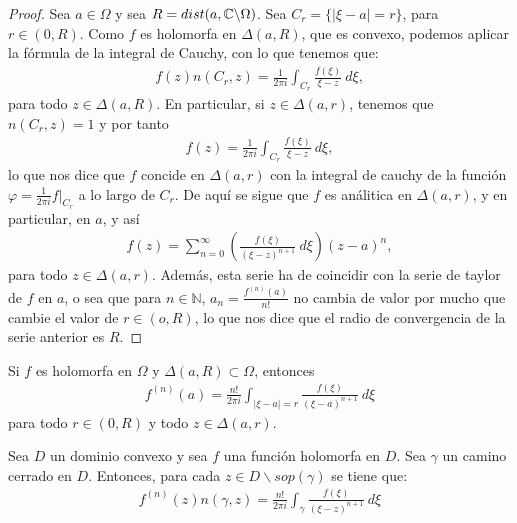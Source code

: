 \begin{proof}
    Sea $a \in \Omega$ y sea $R = dist(a, \mathbb{C} \backslash \Omega)$. Sea $C_r = \{ |\xi - a| = r \}$, para $r \in (0,R)$. Como $f$ es holomorfa en $\Delta(a,R)$, que es convexo, podemos aplicar la fórmula de la integral de Cauchy, con lo que tenemos que:
    \begin{align*}
        f(z)n(C_r,z) = \frac{1}{2\pi i}\int_{C_r}{\frac{f(\xi)}{\xi - z} \ d\xi},
    \end{align*}
    para todo $z \in \Delta(a,R)$. En particular, si $z \in \Delta(a,r)$, tenemos que $n(C_r,z) = 1$ y por tanto
    \begin{align*}
        f(z) = \frac{1}{2\pi i}\int_{C_r}{\frac{f(\xi)}{\xi - z} \ d\xi},
    \end{align*}
    lo que nos dice que $f$ concide en $\Delta(a,r)$ con la integral de cauchy de la función $\varphi = \frac{1}{2\pi i}f|_{C_r}$ a lo largo de $C_r$. De aquí se sigue que $f$ es análitica en $\Delta(a,r)$, y en particular, en $a$, y así
    \begin{align*}
        f(z) = \sum_{n=0}^{\infty}\left( \frac{f(\xi)}{(\xi - z)^{n+1}} \ d\xi \right)(z-a)^n,
    \end{align*}
    para todo $z \in \Delta(a,r)$. Además, esta serie ha de coincidir con la serie de taylor de $f$ en $a$, o sea que para $n \in \mathbb{N}$, $a_n = \frac{f^{(n)}(a)}{n!}$ no cambia de valor por mucho que cambie el valor de $r \in (o,R)$, lo que nos dice que el radio de convergencia de la serie anterior es $R$.
\end{proof}

\begin{obs}
    Si $f$ es holomorfa en $\Omega$ y $\Delta(a,R) \subset \Omega$, entonces
    \begin{align*}
        f^{(n)}(a) = \frac{n!}{2\pi i} \int_{|\xi -a| = r} \frac{f(\xi)}{(\xi - a)^{n+1}} \ d\xi
    \end{align*}
    para todo $r \in (0,R)$ y todo $z \in \Delta(a,r)$.
\end{obs}

\begin{teo}
    Sea $D$ un dominio convexo y sea $f$ una función holomorfa en $D$. Sea $\gamma$ un camino cerrado en $D$. Entonces, para cada $z \in D \backslash sop(\gamma)$ se tiene que:
    \begin{align*}
        f^{(n)}(z)n(\gamma,z) = \frac{n!}{2\pi i} \int_{\gamma} \frac{f(\xi)}{(\xi - z)^{n+1}} \ d\xi
    \end{align*}
\end{teo}

